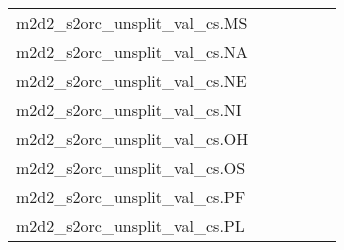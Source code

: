 {\begin{longtable}{m{6cm}m{1.7cm}m{1.7cm}m{1.7cm}m{1.7cm}m{1.7cm}}
	m2d2\_s2orc\_unsplit\_val\_cs.MS  & \colorbox[HTML]{9fd688}{\makebox[\mywidth][c]{13.98}} & \colorbox[HTML]{ccea9c}{\makebox[\mywidth][c]{14.14}} & \colorbox[HTML]{ffffe5}{\makebox[\mywidth][c]{16.27}} & \colorbox[HTML]{c3e698}{\makebox[\mywidth][c]{14.11}} & \colorbox[HTML]{77c578}{\makebox[\mywidth][c]{13.89}}\\
	m2d2\_s2orc\_unsplit\_val\_cs.NA  & \colorbox[HTML]{98d485}{\makebox[\mywidth][c]{10.53}} & \colorbox[HTML]{e4f4ab}{\makebox[\mywidth][c]{10.80}} & \colorbox[HTML]{ffffe5}{\makebox[\mywidth][c]{12.52}} & \colorbox[HTML]{d3eda0}{\makebox[\mywidth][c]{10.71}} & \colorbox[HTML]{77c578}{\makebox[\mywidth][c]{10.47}}\\
	m2d2\_s2orc\_unsplit\_val\_cs.NE  & \colorbox[HTML]{a7da8b}{\makebox[\mywidth][c]{13.76}} & \colorbox[HTML]{dff2a7}{\makebox[\mywidth][c]{14.00}} & \colorbox[HTML]{ffffe5}{\makebox[\mywidth][c]{16.10}} & \colorbox[HTML]{cae99c}{\makebox[\mywidth][c]{13.89}} & \colorbox[HTML]{77c578}{\makebox[\mywidth][c]{13.64}}\\
	m2d2\_s2orc\_unsplit\_val\_cs.NI  & \colorbox[HTML]{a4d98a}{\makebox[\mywidth][c]{10.00}} & \colorbox[HTML]{e7f5ad}{\makebox[\mywidth][c]{10.22}} & \colorbox[HTML]{ffffe5}{\makebox[\mywidth][c]{11.61}} & \colorbox[HTML]{b4e091}{\makebox[\mywidth][c]{10.04}} & \colorbox[HTML]{77c578}{\makebox[\mywidth][c]{9.93}}\\
	m2d2\_s2orc\_unsplit\_val\_cs.OH  & \colorbox[HTML]{acdc8d}{\makebox[\mywidth][c]{15.24}} & \colorbox[HTML]{d8efa2}{\makebox[\mywidth][c]{15.43}} & \colorbox[HTML]{ffffe5}{\makebox[\mywidth][c]{17.62}} & \colorbox[HTML]{c5e799}{\makebox[\mywidth][c]{15.34}} & \colorbox[HTML]{77c578}{\makebox[\mywidth][c]{15.10}}\\
	m2d2\_s2orc\_unsplit\_val\_cs.OS  & \colorbox[HTML]{95d284}{\makebox[\mywidth][c]{14.61}} & \colorbox[HTML]{ddf1a6}{\makebox[\mywidth][c]{14.93}} & \colorbox[HTML]{ffffe5}{\makebox[\mywidth][c]{17.35}} & \colorbox[HTML]{c8e89a}{\makebox[\mywidth][c]{14.80}} & \colorbox[HTML]{77c578}{\makebox[\mywidth][c]{14.53}}\\
	m2d2\_s2orc\_unsplit\_val\_cs.PF  & \colorbox[HTML]{acdc8d}{\makebox[\mywidth][c]{12.60}} & \colorbox[HTML]{e1f3a9}{\makebox[\mywidth][c]{12.82}} & \colorbox[HTML]{ffffe5}{\makebox[\mywidth][c]{14.71}} & \colorbox[HTML]{c9e99b}{\makebox[\mywidth][c]{12.70}} & \colorbox[HTML]{77c578}{\makebox[\mywidth][c]{12.48}}\\
	m2d2\_s2orc\_unsplit\_val\_cs.PL  & \colorbox[HTML]{81c97c}{\makebox[\mywidth][c]{15.43}} & \colorbox[HTML]{ccea9c}{\makebox[\mywidth][c]{15.74}} & \colorbox[HTML]{ffffe5}{\makebox[\mywidth][c]{18.58}} & \colorbox[HTML]{bde395}{\makebox[\mywidth][c]{15.65}} & \colorbox[HTML]{77c578}{\makebox[\mywidth][c]{15.40}}\\

\end{longtable}}
